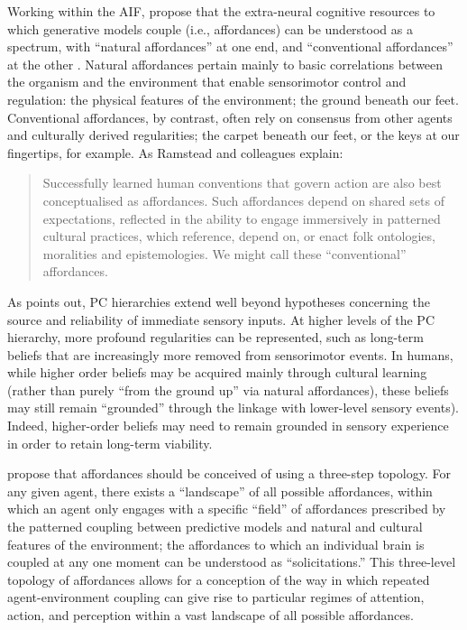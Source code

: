 \begin{CJK}{UTF8}{gbsn}
Working within the AIF, \textcite[7]{Ramstead2016} propose that the extra-neural cognitive resources to which generative models couple (i.e., affordances) can be understood as a spectrum, with ``natural affordances'' at one end, and ``conventional affordances'' at the other \citep{Ramstead2016}.  Natural affordances pertain mainly to basic correlations between the organism and the environment that enable sensorimotor control and regulation: the physical features of the environment; the ground beneath our feet.  Conventional affordances, by contrast, often rely on consensus from other agents and culturally derived regularities; the carpet beneath our feet, or the keys at our fingertips, for example.  As Ramstead and colleagues explain:

\begin{quote}
  Successfully learned human conventions that govern action are also best conceptualised as affordances. Such affordances depend on shared sets of expectations, reflected in the ability to engage immersively in patterned cultural practices, which reference, depend on, or enact folk ontologies, moralities and epistemologies. We might call these ``conventional'' affordances.
\end{quote}

As \textcite[906]{Pezzulo2014} points out, PC hierarchies extend well beyond hypotheses concerning the source and reliability of immediate sensory inputs. At higher levels of the PC hierarchy, more profound regularities can be represented, such as long-term beliefs that are increasingly more removed from sensorimotor events. In humans, while higher order beliefs may be acquired mainly through cultural learning (rather than purely ``from the ground up'' via natural affordances),  these beliefs may still remain ``grounded'' through the linkage with lower-level sensory events).  Indeed, higher-order beliefs may need to remain grounded in sensory experience in order to retain long-term viability.

\textcite{Bruineberg2014} propose that affordances should be conceived of using a three-step topology. For any given agent, there exists a ``landscape'' of all possible affordances, within which an agent only engages with a specific ``field'' of affordances prescribed by the patterned coupling between predictive models and natural and cultural features of the environment; the affordances to which an individual brain is coupled at any one moment can be understood as ``solicitations.''  This three-level topology of affordances allows for a conception of the way in which repeated agent-environment coupling can give rise to particular regimes of attention, action, and perception within a vast landscape of all possible affordances.


\end{CJK}
